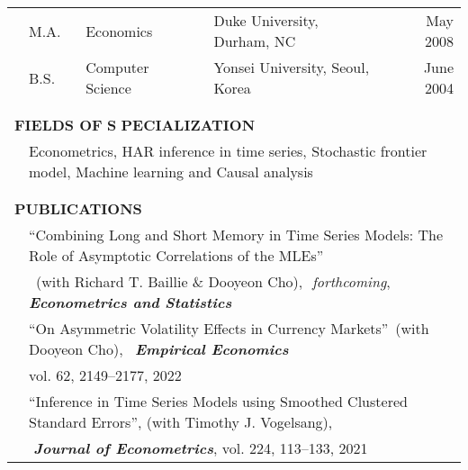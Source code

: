 \documentclass[10pt]{article}
\begin{document}
\begin{center}
\begin{tabular}{llllr}
&\multicolumn{1}{l}{M.A.} & \multicolumn{1}{l}{Economics}& \multicolumn{1}{l}{Duke University, Durham, NC} & \multicolumn{1}{r}{May 2008} \\
&\multicolumn{1}{l}{B.S.} & \multicolumn{1}{l}{Computer Science}& \multicolumn{1}{l}{Yonsei University, Seoul, Korea} & \multicolumn{1}{r}{June 2004} \\
\multicolumn{5}{p{460pt}}{}\\\\
\multicolumn{5}{l}{{\Large \textbf{F}}\textbf{IELDS OF} {\Large \textbf{S}}%
\textbf{PECIALIZATION}} \vspace{0.1cm}\\
& \multicolumn{4}{l}{Econometrics, HAR inference in time series, Stochastic frontier model, Machine learning and Causal analysis} \\
\multicolumn{5}{p{460pt}}{}\\\\
\multicolumn{5}{l}{{\Large \textbf{P}}\textbf{UBLICATIONS}} \vspace{0.1cm}\\
& \multicolumn{4}{l}{\textquotedblleft Combining Long and Short Memory in Time Series Models: The Role of Asymptotic Correlations of the MLEs\textquotedblright \ } \vspace{0.1cm}\\
&\multicolumn{4}{l}{\,\,\,(with Richard T. Baillie \& Dooyeon Cho),\,\, \emph{forthcoming}, {\bf \emph{Econometrics and Statistics}} }\vspace{0.1cm}\\
& \multicolumn{4}{l}{\textquotedblleft On Asymmetric Volatility Effects in Currency Markets\textquotedblright \ (with Dooyeon Cho), \,{\bf\emph{ Empirical Economics}}}\\
& \multicolumn{4}{l}{ \quad vol. 62, 2149--2177, 2022}\vspace{0.1cm}\\
& \multicolumn{4}{l}{\textquotedblleft Inference in Time Series Models using Smoothed Clustered Standard Errors\textquotedblright, (with Timothy J. Vogelsang),}\\
 & \multicolumn{4}{l}{{\bf \emph{ \,\,Journal of Econometrics}}, vol. 224, 113--133, 2021} \vspace{0.1cm}\\

\end{tabular}
\end{center}
\end{document}
